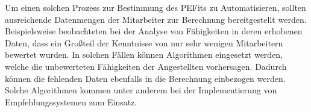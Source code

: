 Um einen solchen Prozess zur Bestimmung des \acp{PEFit} zu Automatisieren, sollten ausreichende Datenmengen der Mitarbeiter zur Berechnung bereitgestellt werden. Beispielsweise beobachteten \textcite[S. 3]{mitre:2014} bei der Analyse von Fähigkeiten in deren erhobenen Daten, dass ein Großteil der Kenntnisse von nur sehr wenigen Mitarbeitern bewertet wurden. In solchen Fällen können Algorithmen eingesetzt werden, welche die unbewerteten Fähigkeiten der Angestellten vorhersagen. Dadurch können die fehlenden Daten ebenfalls in die Berechnung einbezogen werden. Solche Algorithmen kommen unter anderem bei der Implementierung von Empfehlungssystemen zum Einsatz.
